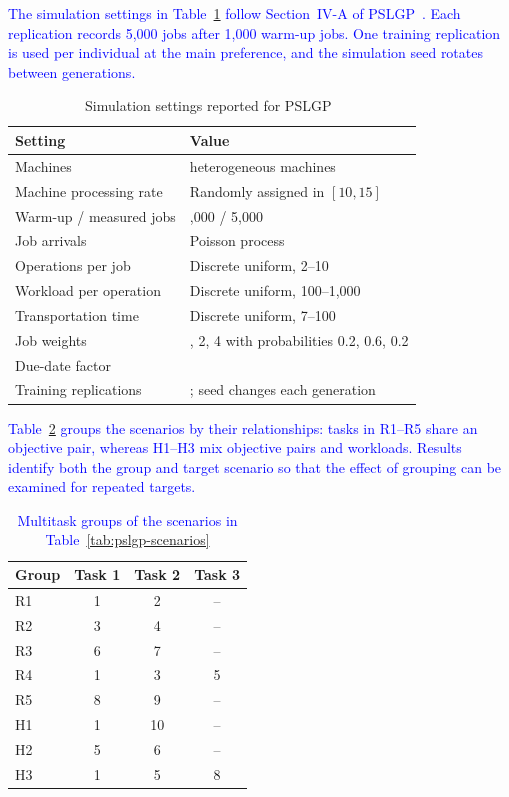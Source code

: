 \documentclass[10pt,journal]{IEEEtran}
\newcommand{\revision}[1]{\textcolor{blue}{#1}}
\begin{document}
\revision{The simulation settings in Table~\ref{tab:simulation-settings} follow Section~IV-A of PSLGP~\cite{xu2026pslgp}. Each replication records 5,000 jobs after 1,000 warm-up jobs. One training replication is used per individual at the main preference, and the simulation seed rotates between generations.}

\begin{table}[t]
\centering
\caption{Simulation settings reported for PSLGP~\cite{xu2026pslgp}}
\label{tab:simulation-settings}
\footnotesize
\begin{tabular}{@{}>{\raggedright\arraybackslash}p{}>{\raggedright\arraybackslash}p{}@{}}
\toprule
Setting & Value \\
\midrule
Machines & 10 heterogeneous machines \\
Machine processing rate & Randomly assigned in $[10,15]$ \\
Warm-up / measured jobs & 1,000 / 5,000 \\
Job arrivals & Poisson process \\
Operations per job & Discrete uniform, 2--10 \\
Workload per operation & Discrete uniform, 100--1,000 \\
Transportation time & Discrete uniform, 7--100 \\
Job weights & 1, 2, 4 with probabilities 0.2, 0.6, 0.2 \\
Due-date factor & 1.5 \\
Training replications & 1; seed changes each generation \\
\bottomrule
\end{tabular}
\end{table}

\revision{Table~\ref{tab:scenario-plan} groups the scenarios by their relationships: tasks in R1--R5 share an objective pair, whereas H1--H3 mix objective pairs and workloads. Results identify both the group and target scenario so that the effect of grouping can be examined for repeated targets.}

\begin{table}[t]
\centering
\caption{\revision{Multitask groups of the scenarios in Table~\ref{tab:pslgp-scenarios}}}
\label{tab:scenario-plan}
\footnotesize
\begin{tabular}{lccc}
\toprule
Group & Task 1 & Task 2 & Task 3 \\
\midrule
R1 & 1 & 2 & -- \\
R2 & 3 & 4 & -- \\
R3 & 6 & 7 & -- \\
R4 & 1 & 3 & 5 \\
R5 & 8 & 9 & -- \\
\midrule
H1 & 1 & 10 & -- \\
H2 & 5 & 6 & -- \\
H3 & 1 & 5 & 8 \\
\bottomrule
\end{tabular}
\end{table}
\end{document}
